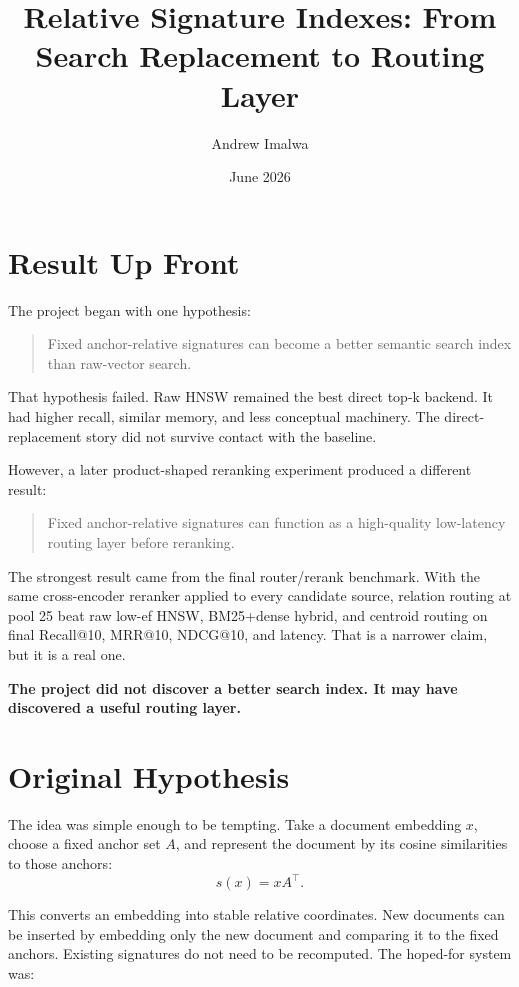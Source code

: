 \documentclass[10pt]{article}
\title{\vspace{-2.2em}\textbf{Relative Signature Indexes: From Search Replacement to Routing Layer}}
\author{Andrew Imalwa}
\date{\vspace{-0.8em}June 2026}
\begin{document}
\maketitle
\vspace{-1.2em}

\section*{Result Up Front}

The project began with one hypothesis:

\begin{quote}
Fixed anchor-relative signatures can become a better semantic search index than raw-vector search.
\end{quote}

That hypothesis failed. Raw HNSW remained the best direct top-k backend. It had higher recall, similar memory, and less conceptual machinery. The direct-replacement story did not survive contact with the baseline.

However, a later product-shaped reranking experiment produced a different result:

\begin{quote}
Fixed anchor-relative signatures can function as a high-quality low-latency routing layer before reranking.
\end{quote}

The strongest result came from the final router/rerank benchmark. With the same cross-encoder reranker applied to every candidate source, relation routing at pool 25 beat raw low-ef HNSW, BM25+dense hybrid, and centroid routing on final Recall@10, MRR@10, NDCG@10, and latency. That is a narrower claim, but it is a real one.

\textbf{The project did not discover a better search index. It may have discovered a useful routing layer.}

\section*{Original Hypothesis}

The idea was simple enough to be tempting. Take a document embedding \(x\), choose a fixed anchor set \(A\), and represent the document by its cosine similarities to those anchors:
\[
s(x) = x A^\top .
\]

This converts an embedding into stable relative coordinates. New documents can be inserted by embedding only the new document and comparing it to the fixed anchors. Existing signatures do not need to be recomputed. The hoped-for system was:
\end{document}
